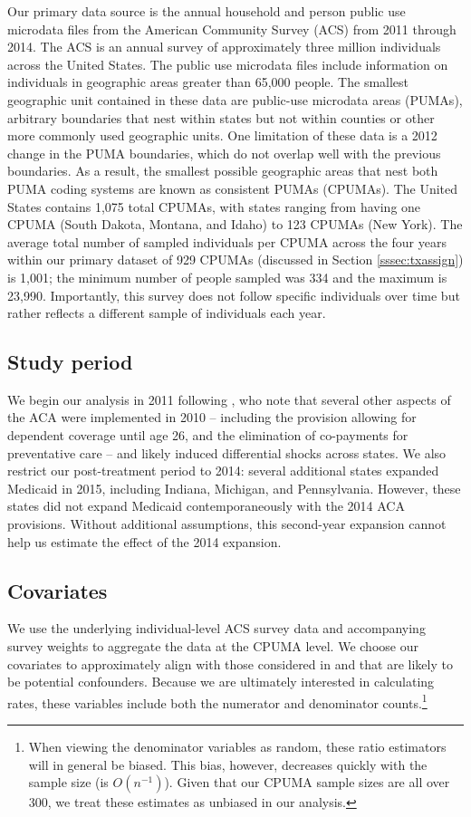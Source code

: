\documentclass{article}
\begin{document}
Our primary data source is the annual household and person public use microdata files from the American Community Survey (ACS) from 2011 through 2014. The ACS is an annual survey of approximately three million individuals across the United States. The public use microdata files include information on individuals in geographic areas greater than 65,000 people. The smallest geographic unit contained in these data are public-use microdata areas (PUMAs), arbitrary boundaries that nest within states but not within counties or other more commonly used geographic units. One limitation of these data is a 2012 change in the PUMA boundaries, which do not overlap well with the previous boundaries. As a result, the smallest possible geographic areas that nest both PUMA coding systems are known as consistent PUMAs (CPUMAs). The United States contains 1,075 total CPUMAs, with states ranging from having one CPUMA (South Dakota, Montana, and Idaho) to 123 CPUMAs (New York). The average total number of sampled individuals per CPUMA across the four years within our primary dataset of 929 CPUMAs (discussed in Section \ref{sssec:txassign}) is 1,001; the minimum number of people sampled was 334 and the maximum is 23,990. Importantly, this survey does not follow specific individuals over time but rather reflects a different sample of individuals each year.

\subsection{Study period}

We begin our analysis in 2011 following \cite{courtemanche2017early}, who note that several other aspects of the ACA were implemented in 2010 -- including the provision allowing for dependent coverage until age 26, and the elimination of co-payments for preventative care -- and likely induced differential shocks across states. We also restrict our post-treatment period to 2014: several additional states expanded Medicaid in 2015, including Indiana, Michigan, and Pennsylvania. However, these states did not expand Medicaid contemporaneously with the 2014 ACA provisions. Without additional assumptions, this second-year expansion cannot help us estimate the effect of the 2014 expansion. 

\subsection{Covariates}

We use the underlying individual-level ACS survey data and accompanying survey weights to aggregate the data at the CPUMA level. We choose our covariates to approximately align with those considered in \cite{courtemanche2017early} and that are likely to be potential confounders. Because we are ultimately interested in calculating rates, these variables include both the numerator and denominator counts.\footnote{When viewing the denominator variables as random, these ratio estimators will in general be biased. This bias, however, decreases quickly with the sample size (is $O(n^{-1})$). Given that our CPUMA sample sizes are all over 300, we treat these estimates as unbiased in our analysis.}
\end{document}
